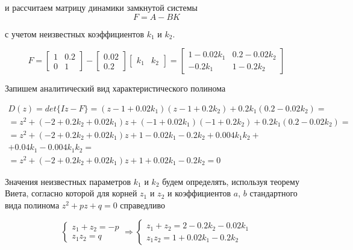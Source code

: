 и рассчитаем матрицу динамики замкнутой системы 
\begin{equation}
	F = A - BK
\end{equation}

с учетом неизвестных коэффициентов $k_1$ и $k_2$.

\begin{equation}
	F =  \begin{bmatrix}
		1 & 0.2\\
		0 & 1
	\end{bmatrix} - \begin{bmatrix}
	0.02\\ 0.2
	\end{bmatrix}\begin{bmatrix}
	k_1 & k_2
	\end{bmatrix} = 
	\begin{bmatrix}
		1 - 0.02k_1 & 0.2 - 0.02k_2\\
		-0.2k_1 & 1-0.2k_2
	\end{bmatrix}
\end{equation}

Запишем аналитический вид характеристического полинома

\begin{multline}
	D(z) = det \{Iz-F\} = (z-1 +0.02k_1)(z - 1 + 0.2k_2) + 0.2k_1(0.2 - 0.02k_2) =\\= z^2 + (- 2 + 0.2k_2 +0.02k_1)z + (-1 +0.02k_1)(- 1 + 0.2k_2)+ 0.2k_1(0.2 - 0.02k_2)=\\=
	z^2 + (- 2 + 0.2k_2 +0.02k_1)z + 1	-0.02k_1 -  0.2k_2 + 0.004k_1k_2 +\\+
	0.04k_1-0.004k_1k_2 =\\= z^2 + (- 2 + 0.2k_2 +0.02k_1)z + 1 +0.02k_1-  0.2k_2 = 0
\end{multline}

Значения неизвестных параметров $k_1$ и $k_2$ будем определять, используя теорему Виета, согласно которой для корней $z_1$ и $z_2$ и коэффициентов $a$, $b$ стандартного вида полинома $z^2 + pz+q=0$ справедливо

\begin{equation}
	\begin{cases}
		z_1 + z_2 = -p\\
		z_1z_2 = q
	\end{cases} \Rightarrow
	\begin{cases}
		z_1 + z_2 = 2 - 0.2k_2 -0.02k_1\\
		z_1z_2 = 1 +0.02k_1-  0.2k_2
	\end{cases}
\end{equation}


